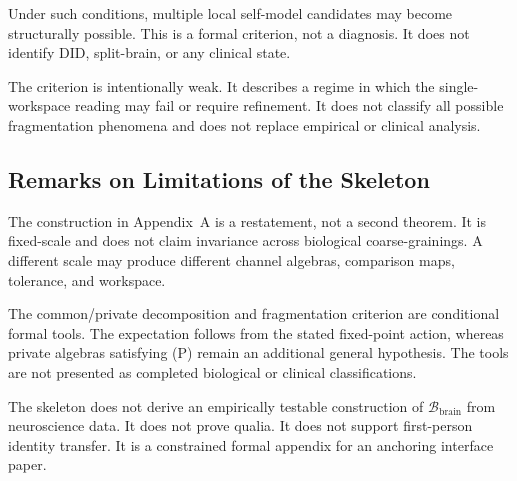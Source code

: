 \documentclass[12pt]{article}
\theoremstyle{definition}
\theoremstyle{remark}
\newcommand{\Bbrain}{\mathcal B_{\mathrm{brain}}}
\begin{document}
Under such conditions, multiple local self-model candidates may become
structurally possible. This is a formal criterion, not a diagnosis. It
does not identify DID, split-brain, or any clinical state.

The criterion is intentionally weak. It describes a regime in which the
single-workspace reading may fail or require refinement. It does not classify
all possible fragmentation phenomena and does not replace empirical or
clinical analysis.

\subsection{Remarks on Limitations of the Skeleton}

The construction in Appendix~A is a restatement, not a second theorem.
It is fixed-scale and does not claim invariance across biological
coarse-grainings. A different scale may produce different channel
algebras, comparison maps, tolerance, and workspace.

The common/private decomposition and fragmentation criterion are
conditional formal tools. The expectation follows from the stated
fixed-point action, whereas private algebras satisfying (P) remain an
additional general hypothesis. The tools are not presented as completed
biological or clinical classifications.

The skeleton does not derive an empirically testable construction of
\(\Bbrain\) from neuroscience data. It does not prove qualia. It does
not support first-person identity transfer. It is a constrained formal
appendix for an anchoring interface paper.

\newpage
{}
\end{document}
